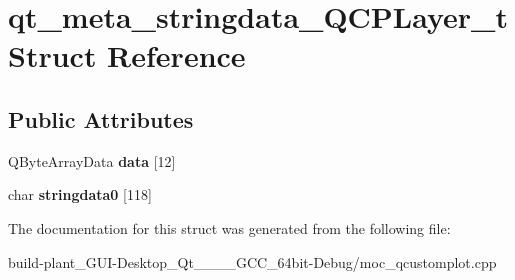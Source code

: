 \hypertarget{structqt__meta__stringdata__QCPLayer__t}{}\section{qt\+\_\+meta\+\_\+stringdata\+\_\+\+Q\+C\+P\+Layer\+\_\+t Struct Reference}
\label{structqt__meta__stringdata__QCPLayer__t}
\subsection*{Public Attributes}
\begin{DoxyCompactItemize}
\item 
\mbox{\label{structqt__meta__stringdata__QCPLayer__t_a8c36428e0f14ee3bf9fb37ad1719be47}} 
Q\+Byte\+Array\+Data {\bfseries data} \mbox{[}12\mbox{]}
\item 
\mbox{\label{structqt__meta__stringdata__QCPLayer__t_a823b98e98042cc0f3c0c9b73fcd0f226}} 
char {\bfseries stringdata0} \mbox{[}118\mbox{]}
\end{DoxyCompactItemize}


The documentation for this struct was generated from the following file\+:\begin{DoxyCompactItemize}
\item 
build-\/plant\+\_\+\+G\+U\+I-\/\+Desktop\+\_\+\+Qt\+\_\+\_\+\_\+\_\+\+G\+C\+C\+\_\+64bit-\/\+Debug/moc\+\_\+qcustomplot.\+cpp\end{DoxyCompactItemize}
